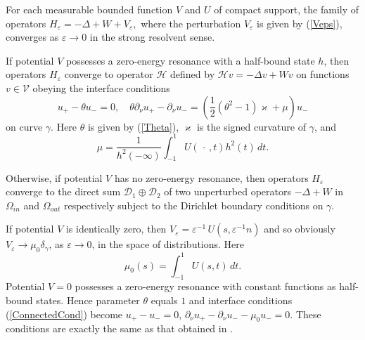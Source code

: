 \documentclass[graybox]{svmult}
\renewcommand{\kappa}{\varkappa}
\newcommand{\eps}{\varepsilon}
\newcommand{\eqref}[1]{(\ref{#1})}
\begin{document}
\begin{theorem}\label{MainThrm}
For each measurable bounded function $V$ and $U$ of compact support, the family of operators
$
 H_\eps=-\Delta +W+V_\eps,
$
where the perturbation $V_\eps$ is given by \eqref{Veps},
converges as $\eps\to 0$ in the strong resolvent sense.

If potential $V$ possesses a zero-energy resonance with a half-bound state $h$, then operators $H_\eps$ converge to  operator $\mathcal{H}$
defined by
$
\mathcal{H} v=-\Delta v+Wv
$
on functions $v\in \mathcal{V}$  obeying the interface conditions
\begin{equation}\label{ConnectedCond}
 u_+-\theta u_-=0,\quad  \theta\partial_\nu u_+-\partial_\nu u_-
=\left(\textstyle\frac{1}{2 }(\theta^2-1)\kappa+\mu\right) u_-
\end{equation}
on curve $\gamma$. Here  $\theta$ is given by  \eqref{Theta},  $\kappa$ is the signed curvature of $\gamma$, and
 \begin{equation}\label{Mu}
  \mu=\frac{1}{h^2(-\infty)} \int_{-1}^1 U(\,\cdot\,,t)h^2(t)\, dt.
 \end{equation}


Otherwise, if potential $V$ has no zero-energy resonance, then operators $H_\eps$ converge to the direct sum $\mathcal{D}_1\oplus\mathcal{D}_2$ of two unperturbed operators $-\Delta +W$ in $\Omega_{in}$ and $\Omega_{out}$ respectively subject to the Dirichlet boundary conditions on $\gamma$.
\end{theorem}


\begin{remark}
  If potential $V$ is identically zero, then $V_\eps=\eps^{-1}\,U\left(s,\eps^{-1}n\right)$ and so obviously
$V_\eps\to \mu_0 \delta_\gamma$, as $\eps\to 0$, in the space of distributions. Here
\begin{equation}\label{Mu0}
  \mu_0(s)=\int_{-1}^1U(s,t)\, dt.
\end{equation}
Potential $V=0$ possesses a zero-energy resonance with constant functions as  half-bound states. Hence parameter $\theta$ equals  $1$ and interface conditions \eqref{ConnectedCond} become
$ u_+- u_-=0$,  $\partial_\nu u_+-\partial_\nu u_-
-\mu_0 u_-=0$. These conditions are exactly the same as that obtained in \cite{BEHL2017}.
\end{remark}






\end{document}
